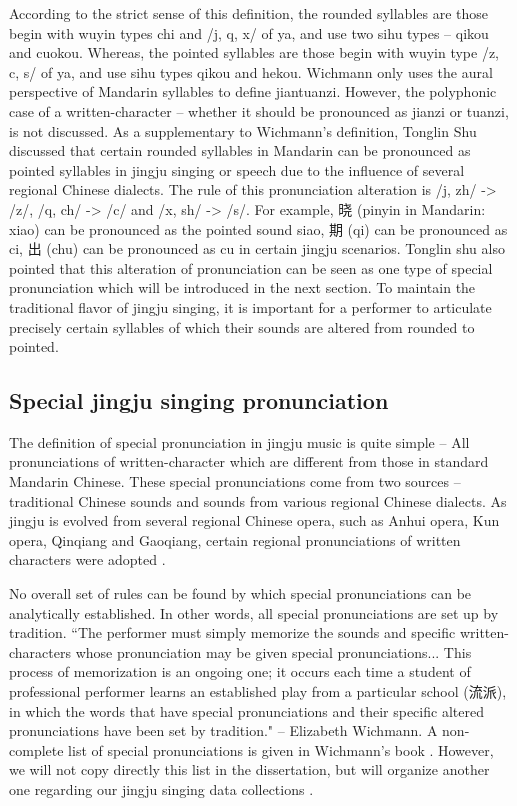 According to the strict sense of this definition, the rounded syllables are those begin with wuyin types chi and /j, q, x/ of ya, and use two sihu types -- qikou and cuokou. Whereas, the pointed syllables are those begin with wuyin type /z, c, s/ of ya, and use sihu types qikou and hekou. Wichmann only uses the aural perspective of Mandarin syllables to define jiantuanzi. However, the polyphonic case of a written-character -- whether it should be pronounced as jianzi or tuanzi, is not discussed. As a supplementary to Wichmann's definition, Tonglin Shu \cite{TonglinShu2011a} discussed that certain rounded syllables in Mandarin can be pronounced as pointed syllables in jingju singing or speech due to the influence of several regional Chinese dialects. The rule of this pronunciation alteration is /j, zh/ -> /z/, /q, ch/ -> /c/ and /x, sh/ -> /s/. For example, 晓 (pinyin in Mandarin: xiao) can be pronounced as the pointed sound siao, 期 (qi) can be pronounced as ci, 出 (chu) can be pronounced as cu in certain jingju scenarios. Tonglin shu also pointed that this alteration of pronunciation can be seen as one type of special pronunciation which will be introduced in the next section. To maintain the traditional flavor of jingju singing, it is important for a performer to articulate precisely certain syllables of which their sounds are altered from rounded to pointed.

\subsection{Special jingju singing pronunciation}\label{sec:ch2:special_pronunciation}

The definition of special pronunciation in jingju music is quite simple -- All pronunciations of written-character which are different from those in standard Mandarin Chinese. These special pronunciations come from two sources -- traditional Chinese sounds and sounds from various regional Chinese dialects. As jingju is evolved from several regional Chinese opera, such as Anhui opera, Kun opera, Qinqiang and Gaoqiang, certain regional pronunciations of written characters were adopted \cite{Wichmann1991a}.

No overall set of rules can be found by which special pronunciations can be analytically established. In other words, all special pronunciations are set up by tradition. ``The performer must simply memorize the sounds and specific written-characters whose pronunciation may be given special pronunciations... This process of memorization is an ongoing one; it occurs each time a student of professional performer learns an established play from a particular school (流派), in which the words that have special pronunciations and their specific altered pronunciations have been set by tradition." -- Elizabeth Wichmann. A non-complete list of special pronunciations is given in Wichmann's book \cite{Wichmann1991a}. However, we will not copy directly this list in the dissertation, but will organize another one regarding our jingju singing data collections .

